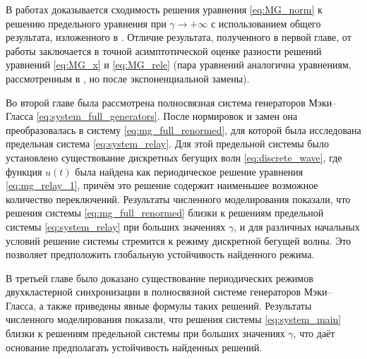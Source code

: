 В работах \cite{Bartha2021, Krisztin2020} доказывается сходимость решения уравнения \eqref{eq:MG_norm} к решению предельного уравнения при $\gamma \to +\infty$ с использованием общего результата, изложенного в \cite[гл. XIV]{Diekmann1995}.
Отличие результата, полученного в первой главе, от работы \cite{Bartha2021} заключается в точной асимптотической оценке разности решений уравнений \eqref{eq:MG_x} и \eqref{eq:MG_rele} (пара уравнений аналогична уравнениям, рассмотренным в \cite{Bartha2021, Krisztin2020}, но после экспоненциальной замены).

Во второй главе была рассмотрена полносвязная система генераторов Мэки--Гласса \eqref{eq:system_full_generators}. После нормировок и замен она преобразовалась в систему \eqref{eq:mg_full_renormed}, для которой была исследована предельная система \eqref{eq:system_relay}. Для этой предельной системы было установлено существование дискретных бегущих волн \eqref{eq:discrete_wave}, где функция $u(t)$ была найдена как периодическое решение уравнения \eqref{eq:mg_relay_1}, причём это решение содержит наименьшее возможное количество переключений. Результаты численного моделирования показали, что решения системы \eqref{eq:mg_full_renormed} близки к решениям предельной системы \eqref{eq:system_relay} при больших значениях $\gamma$, и для различных начальных условий решение системы стремится к режиму дискретной бегущей волны. Это позволяет предположить глобальную устойчивость найденного режима.

В третьей главе было доказано существование периодических режимов двухкластерной синхронизации в полносвязной системе генераторов Мэки--Гласса, а также приведены явные формулы таких решений. Результаты численного моделирования показали, что решения системы \eqref{eq:system_main} близки к решениям предельной системы при больших значениях $\gamma$, что даёт основание предполагать устойчивость найденных решений.






